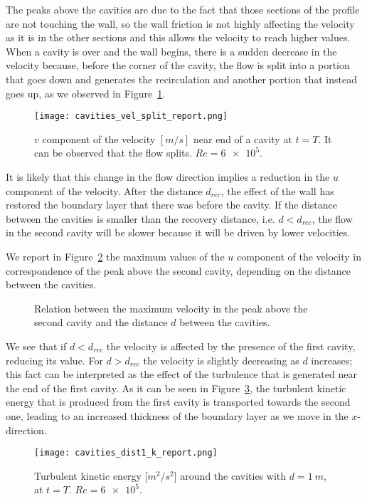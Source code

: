 The peaks above the cavities are due to the fact that those sections of the 
profile are not touching the wall, so the wall friction is not highly affecting 
the velocity as it is in the other sections and this allows the velocity to 
reach higher values. When a cavity is over and the wall begins, there is a 
sudden 
decrease in the velocity because, before the corner of the cavity, the flow is 
split into a portion that goes down and generates the recirculation and another 
portion that instead goes up, as we observed in Figure~\ref{fig:vel_split}.
\begin{figure}
	\centering
	\texttt{[image: cavities\_vel\_split\_report.png]}
	\caption[$v$ component of the velocity near end of a cavity in the cavities 
	problem]{$v$ component of the velocity $[\si{m/s}]$ near end of a cavity at 
	$t=T$. It can be observed that the flow splits. $Re = \num{6e5}$.}
	\label{fig:vel_split}
\end{figure}
It is likely that this change in the flow direction implies a reduction in the 
$u$ component of the velocity. After the 
distance $d_{rec}$, the effect of the wall has restored the boundary layer that 
there was before the cavity. If the distance between the 
cavities is smaller than the recovery distance, i.e. $d < d_{rec}$, the flow in 
the second cavity will be slower because it will be driven by lower velocities.

We report in Figure~\ref{fig:velpeaks} the maximum values of the $u$ component 
of the velocity in correspondence of the peak above the second cavity, 
depending on the distance between the cavities.
\begin{figure}
	\centering
	
	\caption[Relation between the maximum velocity above the second cavity and 
	the distance between the cavities]{Relation between the maximum velocity in the peak above the second cavity and the distance $d$ between the cavities.}
	\label{fig:velpeaks}
\end{figure}
We see that if $d < d_{rec}$ the velocity is affected by the presence of 
the first cavity, reducing its value. For $d>d_{rec}$ the velocity is 
slightly decreasing as $d$ increases; this fact can be interpreted as the 
effect of the turbulence that 
is generated near the end of the first cavity. As it can be seen in 
Figure~\ref{fig:kd1}, the turbulent kinetic energy that is produced from the 
first cavity is transported towards the second one, leading to an increased 
thickness of the boundary layer as we move in the $x$-direction.
\begin{figure}
	\centering
	\texttt{[image: cavities\_dist1\_k\_report.png]}
	\caption[Turbulen kinetic energy in the cavities problem]{Turbulent kinetic energy [$\si{m^2/s^2}$] around the cavities with $d=\SI{1}{m}$, at $t=T$. $Re=\num{6e5}$.}
	\label{fig:kd1}
\end{figure}
%

